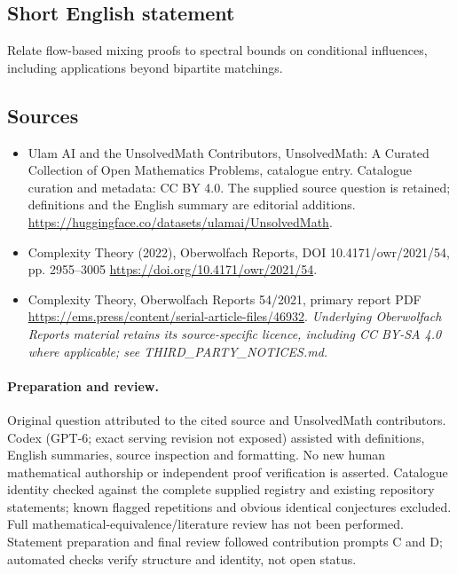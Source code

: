 \documentclass[11pt]{article}
\begin{document}
\subsection{Short English statement}
Relate flow-based mixing proofs to spectral bounds on conditional influences, including applications beyond bipartite matchings.
\subsection{Sources}
\begin{itemize}
\item[\hypertarget{source:statement:1}{S1}] Ulam AI and the UnsolvedMath Contributors, UnsolvedMath: A Curated Collection of Open Mathematics Problems, catalogue entry. Catalogue curation and metadata: CC BY 4.0. The supplied source question is retained; definitions and the English summary are editorial additions.
\url{https://huggingface.co/datasets/ulamai/UnsolvedMath}.
\item[\hypertarget{source:statement:2}{S2}] Complexity Theory (2022), Oberwolfach Reports, DOI 10.4171/owr/2021/54, pp. 2955--3005
\url{https://doi.org/10.4171/owr/2021/54}.
\item[\hypertarget{source:statement:3}{S3}] Complexity Theory, Oberwolfach Reports 54/2021, primary report PDF
\url{https://ems.press/content/serial-article-files/46932}.
\textit{Underlying Oberwolfach Reports material retains its source-specific licence, including CC BY-SA 4.0 where applicable; see THIRD\_PARTY\_NOTICES.md.}
\end{itemize}
\paragraph{Preparation and review.}
Original question attributed to the cited source and UnsolvedMath contributors. Codex (GPT-6; exact serving revision not exposed) assisted with definitions, English summaries, source inspection and formatting. No new human mathematical authorship or independent proof verification is asserted. Catalogue identity checked against the complete supplied registry and existing repository statements; known flagged repetitions and obvious identical conjectures excluded. Full mathematical-equivalence/literature review has not been performed. Statement preparation and final review followed contribution prompts C and D; automated checks verify structure and identity, not open status.
\label{end:statement}
\end{document}

